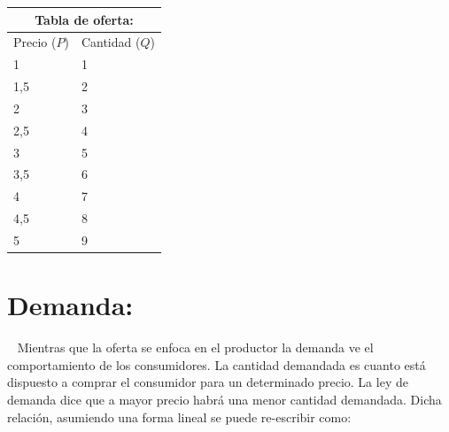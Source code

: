 \documentclass[
  letterpaper,
  DIV=11,
  numbers=noendperiod]{scrreport}
\begin{document}
\begin{multicols}{2}
\begin{table}[H]
    \centering
    \begin{tabular}{|p{25mm}|p{25mm}|}
        \multicolumn{2}{c}{Tabla de oferta:} \\ 
        \hline
        Precio ($P$) & Cantidad ($Q$) \\ \hline
        1 & 1 \\ \hline
        1,5 & 2 \\ \hline
        2 & 3 \\ \hline
        2,5 & 4 \\ \hline
        3 & 5 \\ \hline
        3,5 & 6 \\ \hline
        4 & 7 \\ \hline
        4,5 & 8 \\ \hline
        5 & 9 \\ \hline
        \end{tabular}
\end{table}


\begin{center}
\end{center}
\end{multicols}

\hypertarget{demanda}{%
\section{Demanda:}\label{demanda}}

~ Mientras que la oferta se enfoca en el productor la demanda ve el
comportamiento de los consumidores. La cantidad demandada es cuanto está
dispuesto a comprar el consumidor para un determinado precio. La ley de
demanda dice que a mayor precio habrá una menor cantidad demandada.
Dicha relación, asumiendo una forma lineal se puede re-escribir como:
\end{document}
